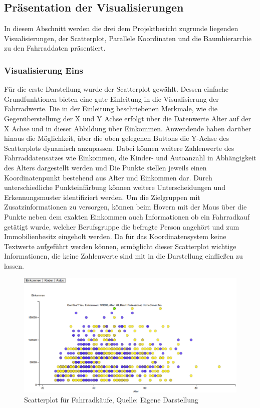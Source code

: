 \documentclass[usegeometry=true]{scrartcl}
\begin{document}
\subsection{Präsentation der Visualisierungen}
In diesem Abschnitt werden die drei dem Projektbericht zugrunde liegenden Visualisierungen, der Scatterplot, Parallele Koordinaten und die Baumhierarchie zu den Fahrraddaten präsentiert. 
\subsubsection{Visualisierung Eins}
Für die erste Darstellung wurde der Scatterplot gewählt. Dessen einfache Grundfunktionen bieten eine gute Einleitung in die Visualisierung der Fahrradwerte. Die in der Einleitung beschriebenen Merkmale, wie die Gegenüberstellung der X und Y Achse erfolgt über die Datenwerte Alter auf der X Achse und in dieser Abbildung über Einkommen. Anwendende haben darüber hinaus die Möglichkeit, über die oben gelegenen Buttons die Y-Achse des Scatterplots dynamisch anzupassen. Dabei können weitere Zahlenwerte des Fahrraddatensatzes wie  Einkommen, die Kinder- und Autoanzahl in Abhängigkeit des Alters dargestellt werden und Die Punkte stellen jeweils einen Koordinatenpunkt bestehend aus Alter und Einkommen dar. Durch unterschiedliche Punkteinfärbung können weitere Unterscheidungen und Erkennungsmuster identifiziert werden. 
Um die Zielgruppen mit Zusatzinformationen zu versorgen, können beim Hovern mit der Maus über die Punkte neben dem exakten Einkommen auch Informationen ob ein Fahrradkauf getätigt wurde, welcher Berufsgruppe die befragte Person angehört und zum Immobilienbesitz eingeholt werden.
Da für das Koordinatensystem keine Textwerte aufgeführt werden können, ermöglicht dieser Scatterplot wichtige Informationen, die keine Zahlenwerte sind mit in die Darstellung einfließen zu lassen.  
\begin{figure}[h]
\begin{center}
\includegraphics[width=16cm]{Bilder/V1Scatterplot.png}
\caption{Scatterplot für Fahrradkäufe, Quelle: Eigene Darstellung}
\end{center}
\end{figure}
\end{document}
